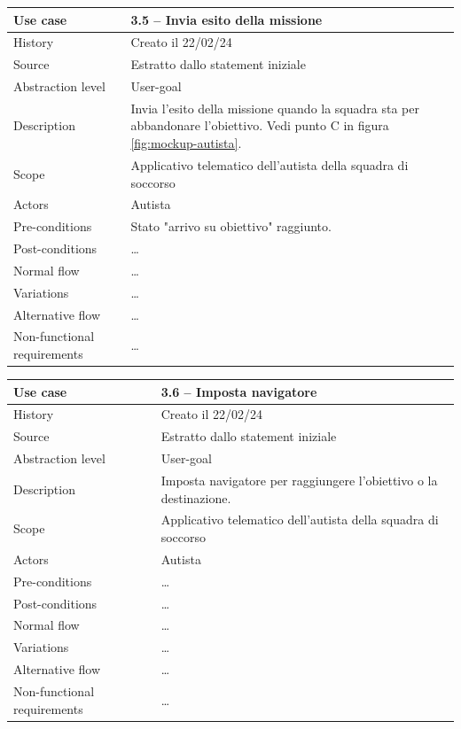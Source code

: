 \documentclass{article}
\begin{document}
    \begin{table}
        \begin{tabularx}{\textwidth}{l|X}
            Use case & \textbf{3.5 – Invia esito della missione}\\
            \hline
            History & Creato il 22/02/24\\
            Source & Estratto dallo statement iniziale\\
            Abstraction level & User-goal\\
            Description & Invia l'esito della missione quando la squadra sta per abbandonare l'obiettivo. Vedi punto C in figura \ref{fig:mockup-autista}.\\
            Scope & Applicativo telematico dell'autista della squadra di soccorso\\
            Actors & Autista\\
            Pre-conditions & Stato "arrivo su obiettivo" raggiunto. \\
            Post-conditions & \dots \\
            Normal flow & \dots\\
            Variations & \dots \\
            Alternative flow & \dots \\
            Non-functional requirements & \dots
        \end{tabularx}
        \label{tab:usecase3.5}
    \end{table}

    \begin{table}
        \begin{tabularx}{\textwidth}{l|X}
            Use case & \textbf{3.6 – Imposta navigatore}\\
            \hline
            History & Creato il 22/02/24\\
            Source & Estratto dallo statement iniziale\\
            Abstraction level & User-goal\\
            Description & Imposta navigatore per raggiungere l'obiettivo o la destinazione.\\
            Scope & Applicativo telematico dell'autista della squadra di soccorso\\
            Actors & Autista\\
            Pre-conditions & \dots \\
            Post-conditions & \dots \\
            Normal flow & \dots\\
            Variations & \dots \\
            Alternative flow & \dots \\
            Non-functional requirements & \dots
        \end{tabularx}
        \label{tab:usecase3.6}
    \end{table}
\end{document}
